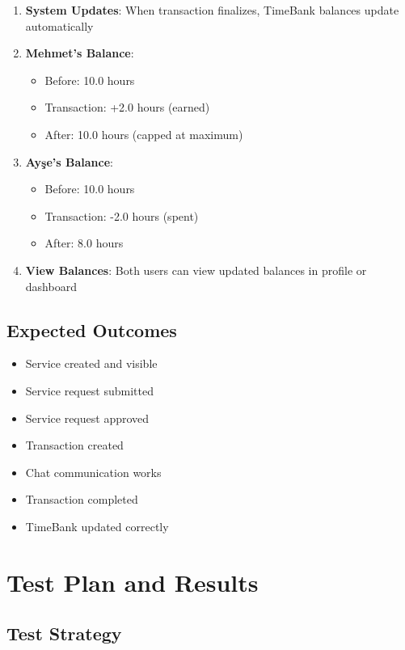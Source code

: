 \documentclass[12pt,a4paper]{report}
\begin{document}
\begin{enumerate}
    \item \textbf{System Updates}: When transaction finalizes, TimeBank balances update automatically
    \item \textbf{Mehmet's Balance}:
          \begin{itemize}
              \item Before: 10.0 hours
              \item Transaction: +2.0 hours (earned)
              \item After: 10.0 hours (capped at maximum)
          \end{itemize}
    \item \textbf{Ayşe's Balance}:
          \begin{itemize}
              \item Before: 10.0 hours
              \item Transaction: -2.0 hours (spent)
              \item After: 8.0 hours
          \end{itemize}
    \item \textbf{View Balances}: Both users can view updated balances in profile or dashboard
\end{enumerate}

\section{Expected Outcomes}

\begin{itemize}
    \item Service created and visible
    \item Service request submitted
    \item Service request approved
    \item Transaction created
    \item Chat communication works
    \item Transaction completed
    \item TimeBank updated correctly
\end{itemize}


\chapter{Test Plan and Results}
\label{chap:tests}

\section{Test Strategy}
\end{document}
